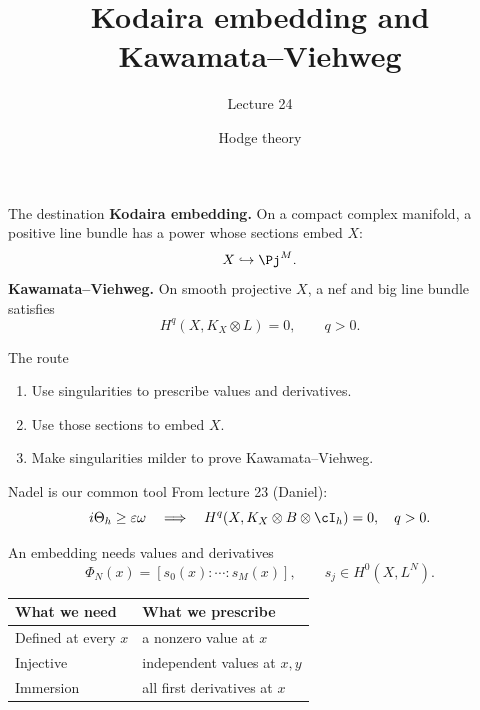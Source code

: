 
\title{Kodaira embedding and Kawamata--Viehweg}
\subtitle{Lecture 24}
\date{Hodge theory}

\begin{frame}\titlepage\end{frame}
\begin{frame}{The destination}
\textbf{Kodaira embedding.} On a compact complex manifold, a positive line bundle has a power whose sections embed \(X\):
\[
X\hookrightarrow\Pj^M.
\]
\bigskip
\textbf{Kawamata--Viehweg.} On smooth projective \(X\), a nef and big line bundle satisfies
\[
H^q(X,K_X\otimes L)=0,\qquad q>0.
\]
\end{frame}

\begin{frame}{The route}
\begin{enumerate}
\setlength{\itemsep}{17pt}
\item Use singularities to prescribe values and derivatives.
\item Use those sections to embed \(X\).
\item Make singularities milder to prove Kawamata--Viehweg.
\end{enumerate}
\end{frame}

\begin{frame}{Nadel is our common tool}
From lecture 23 (Daniel):
\[
i\Theta_h\ge\varepsilon\omega
\quad\Longrightarrow\quad
H^q(X,K_X\otimes B\otimes\cI_h)=0,\quad q>0.
\]
\begin{center}
\end{center}
\end{frame}

\begin{frame}{An embedding needs values and derivatives}
\[
\Phi_N(x)=[s_0(x):\cdots:s_M(x)],\qquad s_j\in H^0(X,L^N).
\]
\bigskip
\begin{center}
\renewcommand{\arraystretch}{1.6}
\begin{tabular}{ll}
What we need & What we prescribe\\
\hline
Defined at every \(x\) & a nonzero value at \(x\)\\
Injective & independent values at \(x,y\)\\
Immersion & all first derivatives at \(x\)
\end{tabular}
\end{center}
\end{frame}

